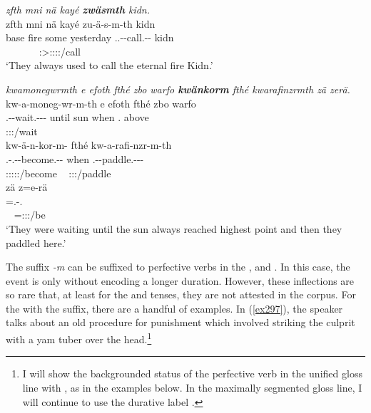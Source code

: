 \begin{exe}
	\ex \emph{zfth mni nä kayé \textbf{zwäsmth} kidn.}\\
	\glll zfth mni nä kayé zu-ä-s-m-th kidn\\
	base fire some yesterday \Tsg.\F.\Betaone-\Ndu-call.\Rs-\Dur-\Stnsg{} kidn\\
	~ ~ ~ ~ {\footnotesize \Stpl:\Sbj>\Tsg:\Obj:\Pst:\Iter:\Dur/call} ~\\
	\trans `They always used to call the eternal fire Kidn.' 
	\label{ex295}
\end{exe}
\begin{exe}
	\ex \emph{kwamonegwrmth e efoth fthé zbo warfo \textbf{kwänkorm} fthé kwarafinzrmth zä zerä.}\\
	\glll kw-a-moneg-wr-m-th e efoth fthé zbo warfo\\
	\M.\Betaone-\Vc-wait.\Ext-\Ndu-\Dur-\Stnsg{} until sun when \Prox.{\All} above\\
	{\footnotesize \Stpl:\Sbj:\Pst:\Dur/wait} ~ ~ ~ ~ ~\\
	\sn
	\glll kw-ä-n-kor-m-\Zero{} fthé kw-a-rafi-nzr-m-th\\
	\M.\Betaone-\Vc.\Ndu-\Venit-become.\Rs-\Dur-\Stsg{} when \M.\Betaone-\Vc-paddle.\Ext-\Ndu-\Dur-\Stnsg{}\\
	{\footnotesize \Stsg:\Sbj:\Pst:\Iter:\Dur:\Venit/become} ~ {\footnotesize \Stpl:\Sbj:\Pst:\Dur/paddle}\\
	\sn
	\glll zä z=e-rä\\
	{\Prox} \Prox=\Stnsg.\Alph-\Cop.{\Ndu}\\
	~ {\footnotesize \Prox=\Stpl:\Sbj:\Nonpast:\Ipfv/be}\\
	\trans `They were waiting until the sun always reached highest point and then they paddled here.' 
	\label{ex296}
\end{exe}

The  suffix \emph{-m} can be suffixed to perfective verbs in the ,  and . In this case, the event is only  without encoding a longer duration. However, these inflections are so rare that, at least for the  and  tenses, they are not attested in the corpus. For the   with the  suffix, there are a handful of examples. In (\ref{ex297}), the speaker talks about an old procedure for punishment which involved striking the culprit with a yam tuber over the head.\footnote{I will show the backgrounded status of the perfective verb in the unified gloss line with \Bg{}, as in the examples below. In the maximally segmented gloss line, I will continue to use the durative label \Dur{}.}

